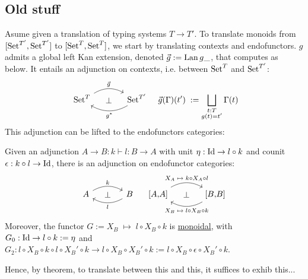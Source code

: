\subsection{Old stuff}
Asume given a translation of typing systems $T \to T'$.
To translate monoids from $[\operatorname{Set}^{T'},\operatorname{Set}^{T'}]$ to $[\operatorname{Set}^T,\operatorname{Set}^T]$,
we start by translating contexts and endofunctors.
$g$ admits a global left Kan extension, denoted
$\vec{g} := \operatorname{Lan}{g}{\_}$, that computes as below.
It entails an adjunction on contexts, i.e. between $\operatorname{Set}^T$ and $\operatorname{Set}^{T'}$:
%
\begin{align*}
  \begin{tikzcd}[ampersand replacement = \&, column sep=large]
      \Set^T
          \ar[r, bend left, "\vec{g}"]
          \ar[r, phantom, "\perp"]
        \& \Set^{T'} \ar[l, bend left, "g^*"]
  \end{tikzcd}
  &&
  \vec{g}(\Gamma)(t') \;:= \bigsqcup_{\substack{t : T \\ g(t) = t'}} \Gamma(t)
\end{align*}
%
This adjunction can be lifted to the endofunctors categories:

\begin{proposition}
  Given an adjunction $A \to B : k \vdash l : B \to A$ with unit $\eta : \operatorname{Id}
  \to l \circ k$ and counit $\epsilon : k \circ l \to \operatorname{Id}$, there is an
  adjunction on endofunctor categories:
  \begin{align*}
    \begin{tikzcd}[ampersand replacement = \&, column sep=large]
      A \ar[r, bend left, "k"]
                \ar[r, phantom, "\perp"]
        \& B \ar[l, bend left, "l"]
    \end{tikzcd}
    &&
    \begin{tikzcd}[ampersand replacement = \&, column sep=large]
        {[}A{,}A{]} \ar[r, bend left, "X_A \;\mapsto\; k \circ X_A \circ l"]
                  \ar[r, phantom, "\perp"]
          \& {[}B{,}B{]} \ar[l, bend left, "X_B \;\mapsto\; l \circ X_B \circ k"]
    \end{tikzcd}
  \end{align*}
  Moreover, the functor $G := X_B \;\mapsto\; l \circ X_B \circ k$ is
  \hyperref[def:monoidal-functor]{monoidal}, with $G_0 : \operatorname{Id} \to l \circ k
  := \eta$ and $G_2 : l \circ X_B \circ k \circ l \circ X_B' \circ k \to l
  \circ X_B \circ X_B' \circ k := l \circ X_B \circ \epsilon \circ X_B'\circ
  k$.
\end{proposition}

Hence, by theorem, to translate between this and this, it suffices to exhib this...




